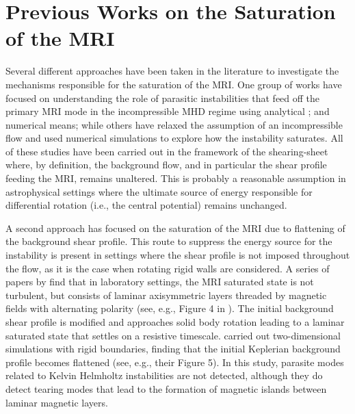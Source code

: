 \documentclass[]{emulateapj}
\begin{document}
\section{Previous Works on the Saturation of the MRI}
\label{previous}

Several different approaches have been taken in the literature to
investigate the mechanisms responsible for the saturation of the MRI.
One group of works have focused on understanding the role of parasitic
instabilities that feed off the primary MRI mode in the incompressible
MHD regime using analytical
\citep{Goodman:1994dd,Pessah:2009gm,Pessah:2010ic}; and numerical
\citep{Latter:2009br,2010A&A...516A..51L} means; while others
\citep{Obergaulinger:2009fv,Latter:2009br} have relaxed the assumption
of an incompressible flow and used numerical simulations to explore
how the instability saturates.  All of these studies have been carried
out in the framework of the shearing-sheet where, by definition, the
background flow, and in particular the shear profile feeding the MRI,
remains unaltered. This is probably a reasonable assumption in
astrophysical settings where the ultimate source of energy responsible
for differential rotation (i.e., the central potential) remains unchanged.

A second approach has focused on the saturation of the MRI due to
flattening of the background shear profile. This route to suppress the
energy source for the instability is present in settings where the
shear profile is not imposed throughout the flow, as it is the case
when rotating rigid walls are considered. A series of papers by
\citet{2005PhFl...17i4106K,2006EAS....21...81J,Jamroz:2008fn,
Jamroz:2008jw,Tatsuno:2008fv,Julien:2010cn} find that in laboratory
settings, the MRI saturated state is not turbulent, but consists of
laminar axisymmetric layers threaded by magnetic fields with
alternating polarity (see, e.g., Figure  4 in
\citealt{Jamroz:2008jw}). The initial background shear profile is
modified and approaches solid body rotation leading to a laminar
saturated state that settles on a resistive timescale.
\citet{Tatsuno:2008fv} carried out two-dimensional simulations with
rigid boundaries, finding that the initial Keplerian background
profile becomes flattened (see, e.g., their Figure  5). In this study,
parasite modes related to Kelvin Helmholtz instabilities are not
detected, although they do detect tearing modes that lead to the
formation of magnetic islands between laminar magnetic layers.
\end{document}
